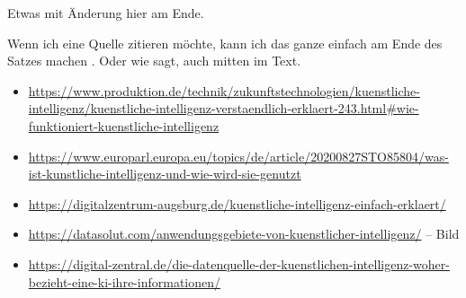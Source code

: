 \documentclass{report}
\begin{document}
Etwas mit Änderung hier am Ende.

Wenn ich eine Quelle zitieren möchte, kann ich das ganze einfach am Ende des Satzes machen \citep{example}. Oder wie \citet{example} sagt, auch mitten im Text.


\begin{itemize}
\item \url{https://www.produktion.de/technik/zukunftstechnologien/kuenstliche-intelligenz/kuenstliche-intelligenz-verstaendlich-erklaert-243.html#wie-funktioniert-kuenstliche-intelligenz}
\item \url{https://www.europarl.europa.eu/topics/de/article/20200827STO85804/was-ist-kunstliche-intelligenz-und-wie-wird-sie-genutzt}
\item \url{https://digitalzentrum-augsburg.de/kuenstliche-intelligenz-einfach-erklaert/}
\item \url{https://datasolut.com/anwendungsgebiete-von-kuenstlicher-intelligenz/} -- Bild
\item \url{https://digital-zentral.de/die-datenquelle-der-kuenstlichen-intelligenz-woher-bezieht-eine-ki-ihre-informationen/}
\end{itemize}

\printbibliography
\end{document}
